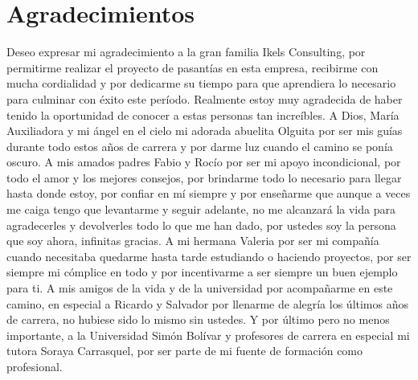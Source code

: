 \chapter*{Agradecimientos}

Deseo expresar mi agradecimiento a la gran familia Ikels Consulting, por permitirme realizar el proyecto de pasantías en esta empresa, recibirme con mucha cordialidad y  por dedicarme su tiempo para que aprendiera lo necesario para culminar con éxito este período. Realmente estoy muy agradecida de haber tenido la oportunidad de conocer a estas personas tan increíbles.
\vskip 0.4cm
A Dios, María Auxiliadora y mi ángel en el cielo mi adorada abuelita Olguita por ser mis guías durante todo estos años de carrera y por darme luz cuando el camino se ponía oscuro.
\vskip 0.4cm
A mis amados padres Fabio y Rocío por ser mi apoyo incondicional, por todo el amor y los mejores consejos, por brindarme todo lo necesario para llegar hasta donde estoy, por confiar en mí siempre y por enseñarme que aunque a veces me caiga tengo que levantarme y seguir adelante, no me alcanzará la vida para agradecerles y devolverles todo lo que me han dado, por ustedes soy la persona que soy ahora, infinitas gracias.
\vskip 0.4cm
A mi hermana Valeria por ser mi compañía cuando necesitaba quedarme hasta tarde estudiando o haciendo proyectos, por ser siempre mi cómplice en todo y por incentivarme a ser siempre un buen ejemplo para ti.
\vskip 0.4cm
A mis amigos de la vida y de la universidad por acompañarme en este camino, en especial a Ricardo y Salvador por llenarme de alegría los últimos años de carrera, no hubiese sido lo mismo sin ustedes.
\vskip 0.4cm
Y por último pero no menos importante, a la Universidad Simón Bolívar y profesores de carrera en especial mi tutora Soraya Carrasquel, por ser parte de mi fuente de formación como profesional.
